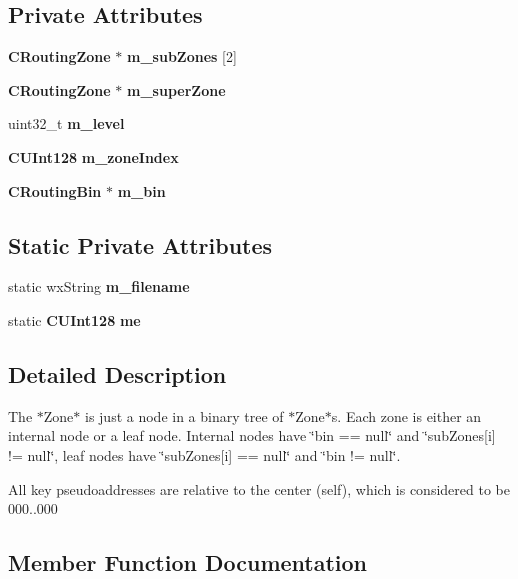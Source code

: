 \subsection*{Private Attributes}
\begin{DoxyCompactItemize}
\item 
{\bf CRoutingZone} $\ast$ {\bf m\_\-subZones} [2]
\item 
{\bf CRoutingZone} $\ast$ {\bfseries m\_\-superZone}\label{classKademlia_1_1CRoutingZone_a04141763e74347968933d35abd5ef9fd}

\item 
uint32\_\-t {\bf m\_\-level}
\item 
{\bf CUInt128} {\bf m\_\-zoneIndex}\label{classKademlia_1_1CRoutingZone_a52dc980eebd311a4e81534c621936c20}

\item 
{\bf CRoutingBin} $\ast$ {\bf m\_\-bin}
\end{DoxyCompactItemize}
\subsection*{Static Private Attributes}
\begin{DoxyCompactItemize}
\item 
static wxString {\bfseries m\_\-filename}\label{classKademlia_1_1CRoutingZone_a3ed551d251bdfc18e619646a8fdcc70a}

\item 
static {\bf CUInt128} {\bfseries me}\label{classKademlia_1_1CRoutingZone_aae07a0686e50443cf7866f27668038d7}

\end{DoxyCompactItemize}


\subsection{Detailed Description}
The $\ast$Zone$\ast$ is just a node in a binary tree of $\ast$Zone$\ast$s. Each zone is either an internal node or a leaf node. Internal nodes have \char`\"{}bin == null\char`\"{} and \char`\"{}subZones[i] != null\char`\"{}, leaf nodes have \char`\"{}subZones[i] == null\char`\"{} and \char`\"{}bin != null\char`\"{}.

All key pseudoaddresses are relative to the center (self), which is considered to be 000..000 

\subsection{Member Function Documentation}
